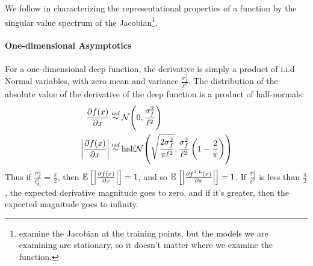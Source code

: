 \documentclass{article}
\begin{document}
We follow \cite{rifai2011contractive} in characterizing the representational properties of a function by the singular value spectrum of the Jacobian\footnote{ \cite{rifai2011contractive} examine the Jacobian at the training points, but the models we are examining are stationary, so it doesn't matter where we examine the function.}.  

\paragraph{One-dimensional Asymptotics}

For a one-dimensional deep function, the derivative is simply a product of i.i.d Normal variables, with zero mean and variance $\frac{\sigma^2_f}{\ell^2}$.  The distribution of the absolute value of the derivative of the deep function is a product of half-normals:
%
\begin{align}
\frac{\partial f(x)}{\partial x} & \distas{iid} \Nt{0}{\frac{\sigma^2_f}{\ell^2}} \\
\left| \frac{\partial f(x)}{\partial x} \right| & \distas{iid} \textnormal{half}\Nt{\sqrt{\frac{2 \sigma^2_f}{\pi\ell^2}}}{\frac{\sigma^2_f}{\ell^2} \left( 1 - \frac{2}{\pi} \right)}
\end{align}
%
Thus if $\frac{\sigma^2_f}{\ell_{d_1}^2} = \frac{\pi}{2}$, then $\mathbb{E}_{} \left[ {\left| \frac{\partial f(x)}{\partial x} \right|} \right] = 1$, and so $\mathbb{E}_{} \left[ {\left| \frac{\partial f^{1:L}(x)}{\partial x} \right|} \right] = 1$.  If $\frac{\sigma^2_f}{\ell^2}$ is less than $\frac{\pi}{2}$, the expected derivative magnitude goes to zero, and if it's greater, then the expected magnitude goes to infinity.  
\end{document}
